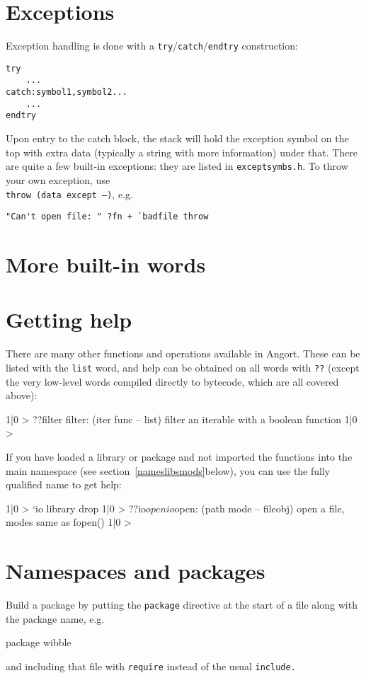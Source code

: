 
\section{Exceptions}
Exception handling is done with a \texttt{try}/\texttt{catch}/\texttt{endtry} 
construction:
\begin{lstlisting}
try
    ...
catch:symbol1,symbol2...
    ...
endtry
\end{lstlisting}
Upon entry to the catch block, the stack will hold the exception symbol
on the top with extra data (typically a string with more information)
under that. There are quite a few built-in exceptions: they are listed
in \texttt{exceptsymbs.h}. To throw your own exception, use \\
\texttt{throw (data except --)}, e.g.
\begin{lstlisting}
"Can't open file: " ?fn + `badfile throw 
\end{lstlisting}


\section{More built-in words}


\section{Getting help}
There are many other functions and operations available in Angort.
These can be listed with the \texttt{list} word, and help can
be obtained on all words with \texttt{??} (except the very low-level words compiled
directly to bytecode, which are all covered above):
\begin{v}
1|0 > ??filter
filter: (iter func -- list) filter an iterable with a boolean function
1|0 > 
\end{v}
If you have loaded a library or package and not imported the functions
into the main namespace (see section~\ref{nameslibsmods}below), you
can use the fully qualified name to get help:
\begin{v}
1|0 > `io library drop
1|0 > ??io$open
io$open: (path mode -- fileobj) open a file, modes same as fopen()
1|0 > 
\end{v}


\section{Namespaces and packages}
\label{packages}
\def\dollarsign{\$}\indw{\dollarsign}
Build a package by putting the \texttt{package} directive at the start
of a file along with the package name, e.g.
\begin{v}
package wibble
\end{v}
and including that file with \texttt{require} instead of the usual \texttt{include.} 

